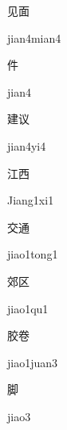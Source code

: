 \begin{verbete}{见面}
\begin{pronuncia}{jian4mian4}
\end{pronuncia}
\end{verbete}

\begin{verbete}[jian4]{件}
\begin{pronuncia}{jian4}
\end{pronuncia}
\end{verbete}

\begin{verbete}[jian4yi4]{建议}
\begin{pronuncia}{jian4yi4}
\end{pronuncia}
\end{verbete}

\begin{verbete}[Jiang1xi1]{江西}
\begin{pronuncia}{Jiang1xi1}
\end{pronuncia}
\end{verbete}

\begin{verbete}{交通}
\begin{pronuncia}{jiao1tong1}
\end{pronuncia}
\end{verbete}

\begin{verbete}[jiao1qu1]{郊区}
\begin{pronuncia}{jiao1qu1}
\end{pronuncia}
\end{verbete}

\begin{verbete}{胶卷}
\begin{pronuncia}{jiao1juan3}
\end{pronuncia}
\end{verbete}

\begin{verbete}[jiao3]{脚}
\begin{pronuncia}{jiao3}
\end{pronuncia}
\end{verbete}

